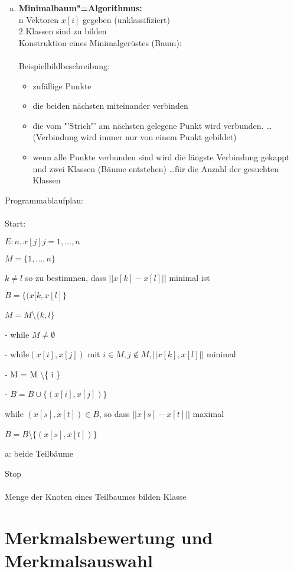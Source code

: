 \documentclass[a4paper,12pt]{scrreprt}
\newcommand{\itemd}[1]{\item{\textbf{#1}} }
\begin{document}
\begin{enumerate}[a)]
\itemd{ Minimalbaum"=Algorithmus:}\\
n Vektoren $x[i]$ gegeben (unklassifiziert)\\
2 Klassen sind zu bilden\\
Konstruktion eines Minimalgerüstes (Baum):\\
\\
Beispielbildbeschreibung:
\begin{itemize}
 \item zufällige Punkte
 \item die beiden nächsten miteinander verbinden
 \item die vom "'Strich"' am nächsten gelegene Punkt wird verbunden. \dots (Verbindung wird immer nur von einem Punkt gebildet)
 \item wenn alle Punkte verbunden sind wird die längste Verbindung gekappt und zwei Klassen (Bäume entstehen) \dots für die Anzahl der gesuchten Klassen
\end{itemize}
\end{enumerate}

Programmablaufplan:\\
\\
Start:\\
\begin{description}
 \item $E: n, x[j] j=1,\dots,n$
 \item $M=\{1,\dots,n\} $
 \item $k \neq l$ so zu bestimmen, dass $|| x[k] -x[l]||$ minimal ist
 \item $B = \{ (x[k,x[l] \}$
 \item $M = M $\textbackslash$ \{ k,l \}$
 \item - while $M \neq \emptyset$
 \item - \quad while$( x[i],x[j])$ mit $i \in M,j \notin M, || x[k],x[l]||$ minimal
 \item - \quad M = M \textbackslash \{ i \}
 \item - \quad$B = B \cup \{ (x[i],x[j]) \}$
 \item * while $(x[s],x[t]) \in B$, so dass $||x[s]-x[t]||$ maximal
 \item * $B = B $\textbackslash$ \{(x[s],x[t])\}$
 \item * a: beide Teilbäume
\end{description}
Stop\\
\\
Menge der Knoten eines Teilbaumes bilden Klasse

\chapter{Merkmalsbewertung und Merkmalsauswahl}
\end{document}
